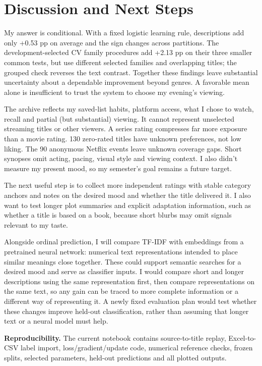 \documentclass[11pt,letterpaper]{article}
\begin{document}
\FloatBarrier
\section{Discussion and Next Steps}

My answer is conditional. With a fixed logistic learning rule, descriptions add only +0.53 pp on average and the sign changes across partitions. The development-selected CV family procedures add +2.13 pp on their three smaller common tests, but use different selected families and overlapping titles; the grouped check reverses the text contrast. Together these findings leave substantial uncertainty about a dependable improvement beyond genres. A favorable mean alone is insufficient to trust the system to choose my evening's viewing.


The archive reflects my saved-list habits, platform access, what I chose to watch, recall and partial (but substantial) viewing. It cannot represent unselected streaming titles or other viewers. A series rating compresses far more exposure than a movie rating. 130 zero-rated titles have unknown preferences, not low liking. The 90 anonymous Netflix events leave unknown coverage gaps. Short synopses omit acting, pacing, visual style and viewing context. I also didn't measure my present mood, so my semester's goal remains a future target.

The next useful step is to collect more independent ratings with stable category anchors and notes on the desired mood and whether the title delivered it. I also want to test longer plot summaries and explicit adaptation information, such as whether a title is based on a book, because short blurbs may omit signals relevant to my taste.

Alongside ordinal prediction, I will compare TF-IDF with embeddings from a pretrained neural network: numerical text representations intended to place similar meanings close together. These could support semantic searches for a desired mood and serve as classifier inputs. I would compare short and longer descriptions using the same representation first, then compare representations on the same text, so any gain can be traced to more complete information or a different way of representing it. A newly fixed evaluation plan would test whether these changes improve held-out classification, rather than assuming that longer text or a neural model must help.

\textbf{Reproducibility.} The current notebook contains source-to-title replay, Excel-to-CSV label import, loss/gradient/update code, numerical reference checks, frozen splits, selected parameters, held-out predictions and all plotted outputs.
\end{document}

